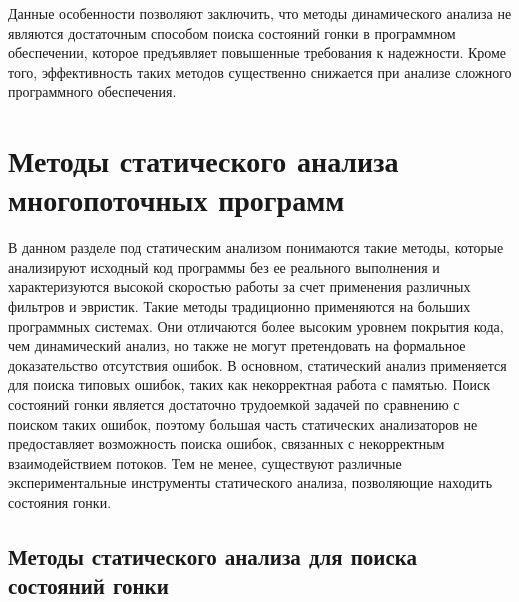 Данные особенности позволяют заключить, что методы динамического анализа не являются достаточным способом поиска состояний гонки в программном обеспечении, которое предъявляет повышенные требования к надежности. 
Кроме того, эффективность таких методов существенно снижается при анализе сложного программного обеспечения.


\section{Методы статического анализа многопоточных программ}
\label{rw:static}

В данном разделе под статическим анализом понимаются такие методы, которые анализируют исходный код программы без ее реального выполнения и характеризуются высокой скоростью работы за счет применения различных фильтров и эвристик.
Такие методы традиционно применяются на больших программных системах.
Они отличаются более высоким уровнем покрытия кода, чем динамический анализ, но также не могут претендовать на формальное доказательство отсутствия ошибок.
В основном, статический анализ применяется для поиска типовых ошибок, таких как некорректная работа с памятью.
Поиск состояний гонки является достаточно трудоемкой задачей по сравнению с поиском таких ошибок, поэтому большая часть статических анализаторов не предоставляет возможность поиска ошибок, связанных с некорректным взаимодействием потоков.
Тем не менее, существуют различные экспериментальные инструменты статического анализа, позволяющие находить состояния гонки.

\subsection{Методы статического анализа для поиска состояний гонки}

